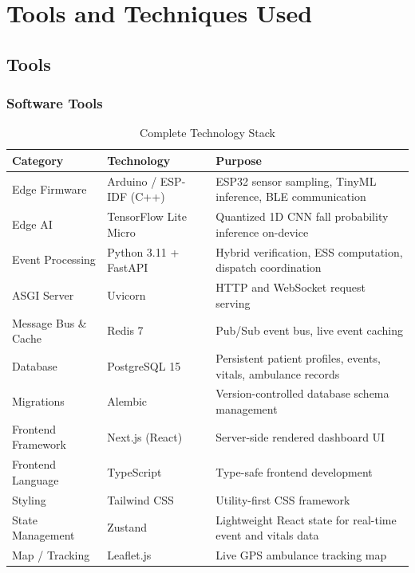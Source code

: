 \chapter{Tools and Techniques Used}

\section[Tools]{\textbf{Tools}}

\subsection{Software Tools}

\begin{table}[htb]
\fontsize{10}{12}\selectfont
\caption{Complete Technology Stack}
\label{tab:tech_stack}
\centering
\begin{tabular}{|p{3.5cm}|p{3.8cm}|p{5cm}|}
	\hline
	\textbf{Category} & \textbf{Technology} & \textbf{Purpose} \\
	\hline
	Edge Firmware & Arduino / ESP-IDF (C++) & ESP32 sensor sampling, TinyML inference, BLE communication \\
	\hline
	Edge AI & TensorFlow Lite Micro & Quantized 1D CNN fall probability inference on-device \\
	\hline
	Event Processing & Python 3.11 + FastAPI & Hybrid verification, ESS computation, dispatch coordination \\
	\hline
	ASGI Server & Uvicorn & HTTP and WebSocket request serving \\
	\hline
	Message Bus \& Cache & Redis 7 & Pub/Sub event bus, live event caching \\
	\hline
	Database & PostgreSQL 15 & Persistent patient profiles, events, vitals, ambulance records \\
	\hline
	Migrations & Alembic & Version-controlled database schema management \\
	\hline
	Frontend Framework & Next.js (React) & Server-side rendered dashboard UI \\
	\hline
	Frontend Language & TypeScript & Type-safe frontend development \\
	\hline
	Styling & Tailwind CSS & Utility-first CSS framework \\
	\hline
	State Management & Zustand & Lightweight React state for real-time event and vitals data \\
	\hline
	Map / Tracking & Leaflet.js & Live GPS ambulance tracking map \\
	\hline

\end{tabular}
\end{table}
